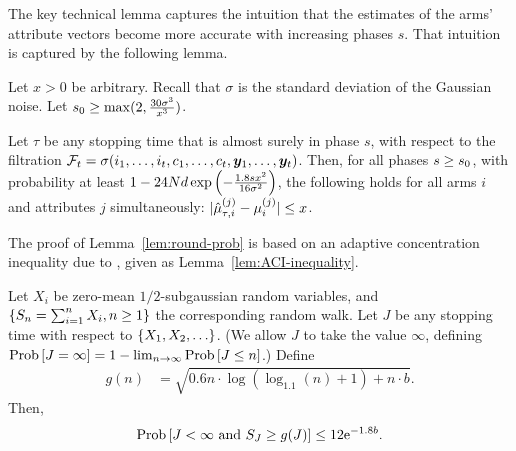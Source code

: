The key technical lemma captures the intuition that
the estimates of the arms' attribute vectors become
more accurate with increasing phases $s$.
That intuition is captured by the following lemma.

\begin{lemma} \label{lem:round-prob}
Let $x > 0$ be arbitrary.
Recall that $\sigma$ is the standard deviation of the Gaussian noise.
Let $s_0 \geq \max (2, \frac{30 \sigma^3}{x^3})$.

Let $\tau$ be any stopping time that is almost surely  in phase $s$,
with respect to the filtration
$\mathcal{F}_{t} = \sigma (i_{1}, \ldots, i_{t},
                          c_{1}, \ldots, c_{t},
                          \bm{y}_{1}, \ldots, \bm{y}_{t})$.
Then, for all phases $s \geq s_0$,
with probability at least 
$1- 24 N d \exp\left(-\frac{1.8 s x^2}{16 \sigma^2} \right)$,
the following holds for all arms $i$ and attributes $j$
simultaneously:
$|\hat{\mu}_{\tau,i}^{(j)} - \mu_{i}^{(j)}| \leq x$.
\end{lemma}

The proof of Lemma~\ref{lem:round-prob} is based on an adaptive
concentration inequality due to \cite{zhao2016adaptive},
given as Lemma~\ref{lem:ACI-inequality}.

\begin{lemma}
\label{lem:ACI-inequality}
Let $X_i$ be zero-mean $1/2$-subgaussian random variables,
and $\{ S_n = \sum_{i=1}^n X_i, n \geq 1 \}$ the corresponding random walk.
Let $J$ be any stopping time with respect to $\{ X_1, X_2, \ldots \}$.
(We allow $J$ to take the value $\infty$,
defining $\Prob{J = \infty} = 1 - \lim_{n \to \infty} \Prob{J \leq n}$.)
Define 
\begin{align*}
g(n) & = \sqrt{0.6 n \cdot \log (\log_{1.1}(n) + 1) + n \cdot b}.
\end{align*}
Then, 
\begin{align*}
\Prob{J < \infty \mbox{ and } S_J \geq g(J)} \leq 12 \e^{-1.8 b}.
\end{align*}
\end{lemma}

